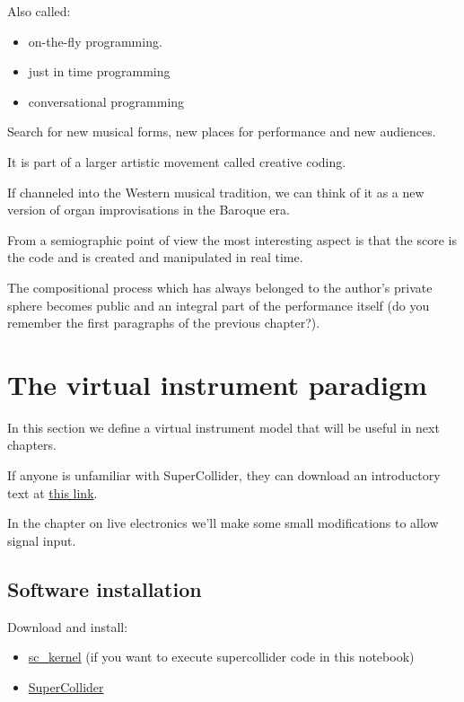 Also called:

\begin{itemize}
\tightlist
\item on-the-fly programming.
\item just in time programming
\item conversational programming
\end{itemize}

Search for new musical forms, new places for performance and new audiences.

It is part of a larger artistic movement called creative coding.

If channeled into the Western musical tradition, we can think of it as a new version of organ improvisations in the Baroque era.

From a semiographic point of view the most interesting aspect is that the score is the code and is created and manipulated in real time.

The compositional process which has always belonged to the author's private sphere becomes public and an integral part of the performance itself (do you remember the first paragraphs of the previous chapter?).

\section{The virtual instrument paradigm}\label{the-virtual-instrument-paradigm}

In this section we define a virtual instrument model that will be useful in next chapters.

If anyone is unfamiliar with SuperCollider, they can download an introductory text at
\href{https://ccrma.stanford.edu/~ruviaro/texts/A_Gentle_Introduction_To_SuperCollider.pdf}{this
link}.

In the chapter on live electronics we'll make some small modifications to allow signal input.

\subsection{Software installation }\label{software-installation}

Download and install:

\begin{itemize}
\tightlist
\item \href{https://github.com/capital-G/sc_kernel}{sc\_kernel} (if you want to execute supercollider code in this notebook)
\item \href{https://supercollider.github.io/}{SuperCollider}
\end{itemize}

